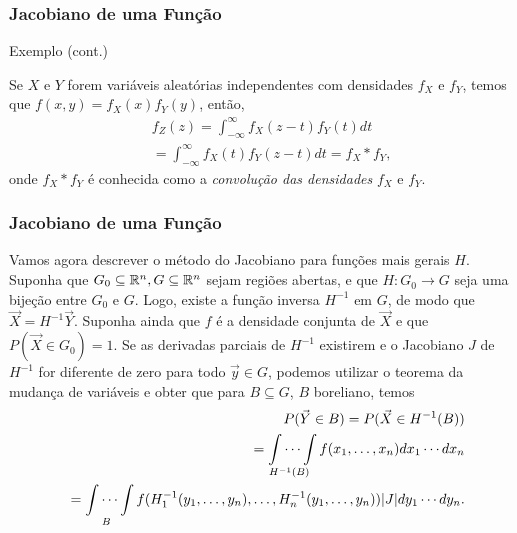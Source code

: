\begin{frame}
\frametitle{\textbf{Jacobiano de uma Função}}
\baselineskip=13pt
\begin{block}{Exemplo (cont.)}


Se $X$ e $Y$ forem variáveis aleatórias independentes com densidades $f_X$ e $f_Y$, temos que $f(x,y)=f_X(x)f_Y(y)$, então,
\begin{eqnarray}
& & f_Z(z)=\int_{-\infty}^{\infty}f_X(z-t)f_Y(t)dt \nonumber \\
& &=\int_{-\infty}^{\infty}f_X(t)f_Y(z-t)dt  =f_X*f_Y,\nonumber
\end{eqnarray}
onde $f_X*f_Y$ é conhecida como a {\em convolução das densidades} $f_X$ e $f_Y$.


\end{block}
\end{frame}

\begin{frame}
\frametitle{\textbf{Jacobiano de uma Função}}
\baselineskip=13pt
\begin{block}{}


Vamos agora descrever o método do Jacobiano para funções mais gerais $H$. Suponha que $G_0\subseteq \mathbb{R}^n,G\subseteq \mathbb{R}^n$ sejam regiões abertas, e que $H:G_0\rightarrow G$ seja uma bijeção entre $G_0$ e $G$. Logo, existe a função inversa $H^{-1}$ em $G$, de modo que $\vec{X}=H^{-1}\vec{Y}$. Suponha ainda que $f$ é a densidade conjunta de $\vec{X}$ e que $P(\vec{X}\in G_0)=1$. Se as derivadas parciais de $H^{-1}$ existirem e o Jacobiano $J$ de $H^{-1}$ for diferente de zero para todo $\vec{y}\in G$, podemos utilizar o teorema da mudança de variáveis e obter que para $B\subseteq G$, $B$ boreliano, temos
\begin{eqnarray}
& & P(\vec{Y}\in B)=P(\vec{X}\in H^{-1}(B))\nonumber\\
& & =\idotsint\limits_{H^{-1}(B)} f(x_1,\ldots,x_n)dx_1\cdots dx_n \nonumber\\
& & =\idotsint\limits_{B} f(H_1^{-1}(y_1,\ldots,y_n),\ldots,H_n^{-1}(y_1,\ldots,y_n))|J|dy_1\cdots dy_n.\nonumber
\end{eqnarray}

\end{block}
\end{frame}

